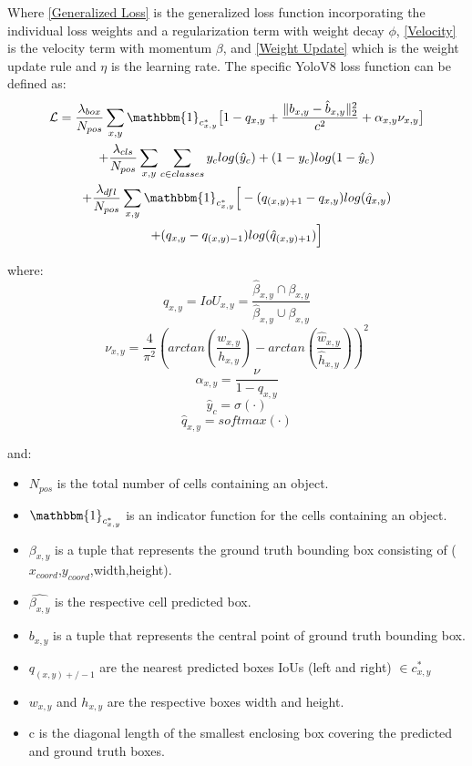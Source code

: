 \documentclass[10pt,twocolumn,letterpaper]{article}
\begin{document}
Where \ref{Generalized Loss} is the generalized loss function incorporating the individual loss weights and a regularization term with weight decay $\phi$, \ref{Velocity} is the velocity term with momentum $\beta$, and \ref{Weight Update} which is the weight update rule and $\eta$ is the learning rate. The specific YoloV8 loss function can be defined as:
\begin{multline}
\mathcal{L} = \dfrac{\lambda_{box}}{N_{pos}}\sum_{x,y}\mathbbm{1}_{c^*_{x,y}}\big[1 - q_{x,y} + \dfrac{\Vert b_{x,y} - \hat{b}_{x,y} \Vert_2^2}{c^2} + \alpha_{x,y}\nu_{x,y}\big] \\  + \dfrac{\lambda_{cls}}{N_{pos}}\sum_{x,y}\sum_{c\in classes}y_clog(\hat{y}_c) + (1 - y_c)log(1 - \hat{y}_c) \\
+ \dfrac{\lambda_{dfl}}{N_{pos}}\sum_{x,y}\mathbbm{1}_{c^*_{x,y}}\Big[-(q_{(x,y)+1} - q_{x,y})log(\hat{q}_{x,y}) \\
+ (q_{x,y} - q_{(x,y)-1})log(\hat{q}_{(x,y)+1})\Big]
\end{multline}

where:
\begin{equation*}\label{IoU}
q_{x,y} = IoU_{x,y} = \dfrac{\hat{\beta}_{x,y}\displaystyle \cap\beta_{x,y}}{\hat{\beta}_{x,y}\displaystyle \cup\beta_{x,y}}
\end{equation*}
\begin{equation*}\label{v}
\nu_{x,y} = \dfrac{4}{\pi^2}(arctan(\dfrac{w_{x,y}}{h_{x,y}}) - arctan(\dfrac{\hat{w}_{x,y}}{\hat{h}_{x,y}}))^2
\end{equation*}
\begin{equation*}\label{a}
\alpha_{x,y} = \dfrac{\nu}{1 - q_{x,y}}
\end{equation*}
\begin{equation*}\label{y_hat}
\hat{y}_c = \sigma({\cdot})
\end{equation*}
\begin{equation*}\label{q_hat}
\hat{q}_{x,y} = softmax({\cdot})
\end{equation*}
    
    
and:
\begin{itemize}[noitemsep]
\item $N_{pos}$ is the total number of cells containing an object.
\item $\mathbbm{1}_{c^*_{x,y}}$ is an indicator function for the cells containing an object. 
\item $\beta_{x,y}$ is a tuple that represents the ground truth bounding box consisting of ($x_{coord}$,$y_{coord}$,width,height).
\item $\hat{\beta_{x,y}}$ is the respective cell predicted box.
\item $b_{x,y}$ is a tuple that represents the central point of ground truth bounding box.
\item $q_{(x,y)+/- 1}$ are the nearest predicted boxes IoUs (left and right) $\in c^*_{x,y}$
\item $w_{x,y}$ and $h_{x,y}$ are the respective boxes width and height.
\item c is the diagonal length of the smallest enclosing box covering the predicted and ground truth boxes.
\end{itemize}
\end{document}
